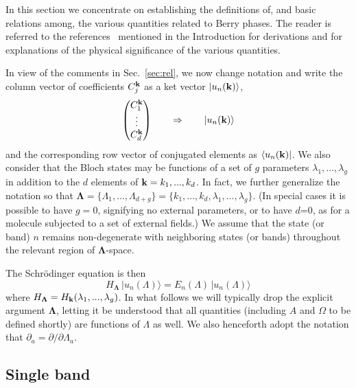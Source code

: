 \documentclass[11pt]{article}
\numberwithin{equation}{section} %
\def\n{\noindent}
\def\beq{\begin{equation}}
\def\eeq{\end{equation}}
\def\ket#1{\vert #1 \rangle}
\def\bra#1{\langle #1 \vert}
\def\pa{\partial_a}
\def\k{{\bf k}}
\def\l{\lambda}
\def\L{\Lambda}
\def\bL{\mathbf{\Lambda}}
\begin{document}
In this section we concentrate on establishing the definitions of,
and basic relations among, the various quantities related to
Berry phases.  The reader is referred to the
references~\cite{resta-rmp,vand-resta,xcn,resta-jpcm,wiki-berry}
mentioned in the Introduction for derivations and for explanations
of the physical significance of the various quantities.

In view of the comments in Sec.~\ref{sec:rel}, we now change notation
and write the column vector of coefficients $C^{\n\k}_j$ as a ket
vector $\ket{u_n(\k)}$,
%
\beq
\begin{pmatrix}
C^{\n\k}_1 \cr \vdots \cr C^{\n\k}_d
\end{pmatrix}
\qquad\Rightarrow\qquad
\ket{u_n(\k)}
\label{eq:notat}
\eeq
%
and the corresponding row vector of conjugated
elements as $\bra{u_n(\k)}$.  We also consider that the Bloch
states may be functions of a set of $g$ parameters $\l_1,...,\l_g$
in addition to the $d$ elements of $\k=k_1,...,k_d$.  In fact,
we further generalize the notation so that
$\bL=\{\L_1,...,\L_{d+g}\} = \{k_1,...,k_d,\l_1,...,\l_g\}$.
(In special cases it is possible to have $g=0$, signifying no
external parameters, or to have $d$=0, as for a molecule
subjected to a set of external fields.)
We assume that the state (or band) $n$ remains non-degenerate with neighboring
states (or bands) throughout the relevant region of $\bL$-space.

The Schr\"odinger equation is then
%
\beq
H_\bL\,\ket{u_n(\L)} = E_n(\L)\,\ket{u_n(\L)}
\eeq
%
where $H_\bL=H_\k(\l_1,...,\l_g)$.  In what follows we will
typically drop the explicit argument $\bL$, letting it be
understood that all quantities (including $A$ and $\Omega$ to
be defined shortly) are functions of $\L$ as well.  We also
henceforth adopt the notation that $\pa=\partial/\partial\L_a$.

\subsection{Single band}
\end{document}
